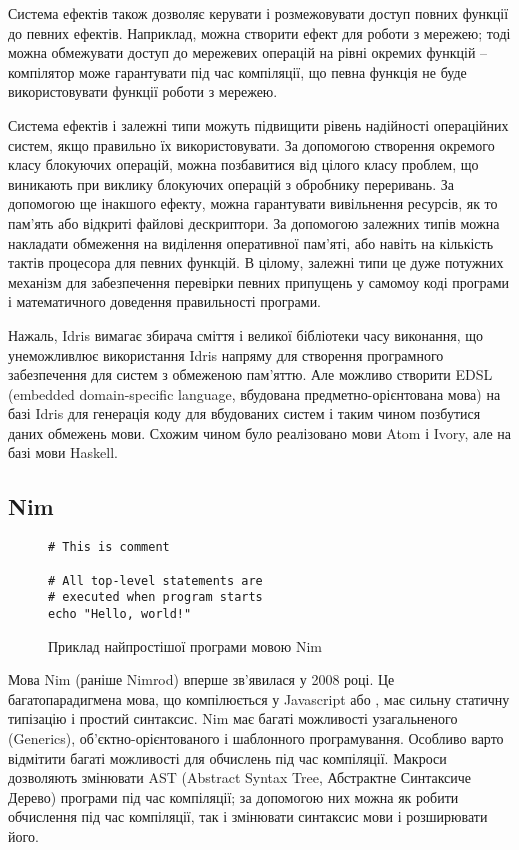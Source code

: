 \documentclass[main.tex]{subfiles}
\begin{document}
Система ефектів також дозволяє керувати і розмежовувати доступ повних функції до певних ефектів. Наприклад, можна створити ефект для роботи з мережею; тоді можна обмежувати доступ до мережевих операцій на рівні окремих функцій -- компілятор може гарантувати під час компіляції, що певна функція не буде використовувати функції роботи з мережею.

Система ефектів і залежні типи можуть підвищити рівень надійності операційних систем, якщо правильно їх використовувати. За допомогою створення окремого класу блокуючих операцій, можна позбавитися від цілого класу проблем, що виникають при виклику блокуючих операцій з обробнику переривань. За допомогою ще інакшого ефекту, можна гарантувати вивільнення ресурсів, як то пам'ять або відкриті файлові дескриптори. За допомогою залежних типів можна накладати обмеження на виділення оперативної пам'яті, або навіть на кількість тактів процесора для певних функцій. В цілому, залежні типи це дуже потужних механізм для забезпечення перевірки певних припущень у самомоу коді програми і математичного доведення правильності програми.

Нажаль, Idris вимагає збирача сміття і великої бібліотеки часу виконання, що унеможливлює використання Idris напряму для створення програмного забезпечення для систем з обмеженою пам'яттю. Але можливо створити EDSL (embedded domain-specific language, вбудована предметно-орієнтована мова) на базі Idris для генерація коду для вбудованих систем і таким чином позбутися даних обмежень мови. Схожим чином було реалізовано мови Atom\cite{haskell:atom} і Ivory\cite{haskell:ivory}, але на базі мови Haskell\cite{haskell}.

\subsection{Nim}

\begin{figure}[!bp]
  \centering
  \begin{verbatim}
# This is comment

# All top-level statements are
# executed when program starts
echo "Hello, world!"
  \end{verbatim}
  \caption{Приклад найпростішої програми мовою Nim}
  \label{example:nim}
\end{figure}

Мова Nim\cite{nim} (раніше Nimrod) вперше зв'явилася у 2008 році. Це багатопарадигмена мова, що компілюється у Javascript або \LangC{}, має сильну статичну типізацію і простий синтаксис. Nim має багаті можливості узагальненого (Generics), об'єктно-орієнтованого і шаблонного програмування. Особливо варто відмітити багаті можливості для обчислень під час компіляції. Макроси дозволяють змінювати AST (Abstract Syntax Tree, Абстрактне Синтаксиче Дерево) програми під час компіляції; за допомогою них можна як робити обчислення під час компіляції, так і змінювати синтаксис мови і розширювати його.
\end{document}

